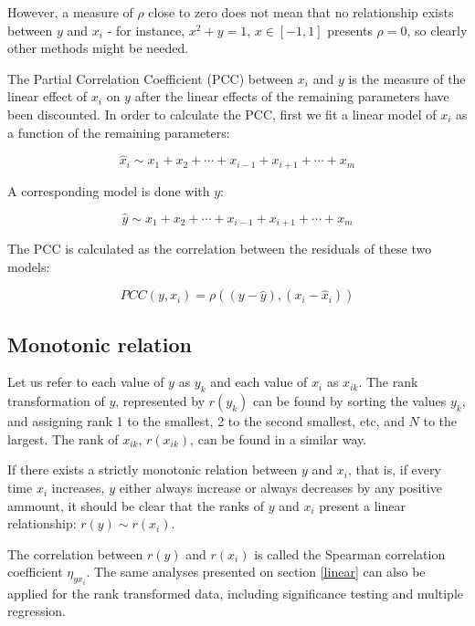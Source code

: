 However, a measure of $\rho$ close to zero does not mean that
no relationship exists between $y$ and $x_i$ - for instance, $x^2 + y = 1$, 
$x \in [-1,1]$ presents $\rho = 0$, so clearly other methods might be needed.

The Partial Correlation Coefficient (PCC) between $x_i$ and $y$ is the measure
of the linear effect of $x_i$ on $y$ after the linear effects of the remaining
parameters have been discounted. In order to calculate the PCC, first we fit
a linear model of $x_i$ as a function of the remaining parameters:

\begin{equation}
	\hat{x}_i \sim x_1 + x_2 + \cdots + x_{i-1} + x_{i+1} + \cdots + x_m
	\label{PCChatx}
\end{equation}

A corresponding model is done with $y$:

\begin{equation}
	\hat{y} \sim x_1 + x_2 + \cdots + x_{i-1} + x_{i+1} + \cdots + x_m
	\label{PCChaty}
\end{equation}

The PCC is calculated as the correlation between the residuals of these two
models:

\begin{equation}
	PCC(y, x_i) = \rho \left( (y - \hat y), (x_i - \hat{x}_i) \right)
	\label{PCC}
\end{equation}


\subsection{Monotonic relation}

Let us refer to each value of $y$ as $y_k$ and each value of $x_i$ as 
$x_{ik}$. The rank transformation of $y$, 
represented by $r(y_k)$ can
be found by sorting the values $y_k$, and assigning rank 1 to the smallest, 2 
to the second smallest, etc, and $N$ to the largest. The rank of $x_{ik}$,
$r(x_{ik})$, can be found in a similar way.

If there exists a strictly monotonic relation between $y$ and $x_i$, that is,
if every time $x_i$ increases, $y$ either always increase or always decreases
by any positive ammount, it should
be clear that the ranks of $y$ and $x_i$ present a linear relationship: 
$r(y) \sim r(x_i)$.

The correlation between $r(y)$ and $r(x_i)$ is called the Spearman 
correlation coefficient
$\eta_{yx_i}$. The same analyses presented on section \ref{linear} can also be
applied for the rank transformed data, including significance testing and 
multiple regression.

